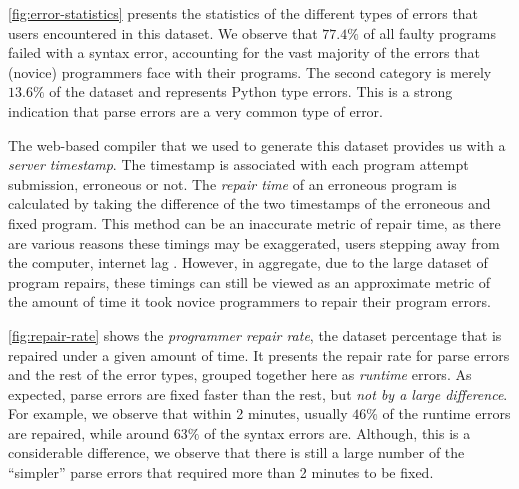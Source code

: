 %
\autoref{fig:error-statistics} presents the statistics
of the different types of errors that users encountered
in this dataset.
%
We observe that $77.4 \% $ of all faulty programs failed
with a syntax error, accounting for the vast majority of
the errors that (novice) programmers face with their
programs.
%
The second category is merely $13.6\%$ of the dataset and
represents Python type errors. This is a strong indication
that parse errors are a very common type of error.

%
The web-based compiler that we used to generate this
dataset provides us with a \emph{server timestamp}.
%
The timestamp is associated with each program attempt
submission, erroneous or not. The \emph{repair time}
of an erroneous program is calculated by taking the
difference of the two timestamps of the erroneous and
fixed program.
%
This method can be an inaccurate metric of repair time,
as there are various reasons these timings may be exaggerated,
\eg users stepping away from the computer, internet lag \etc.
%
However, in aggregate, due to the large
dataset of program repairs, these timings
can still be viewed as an approximate metric
of the amount of time it took novice programmers to
repair their program errors.

\autoref{fig:repair-rate} shows the \emph{programmer repair rate},
\ie the dataset percentage that is repaired under a given amount of time.
%
It presents the repair rate for parse errors and the rest
of the error types, grouped together here as \emph{runtime} errors.
%
As expected, parse errors are fixed faster than the rest,
but \emph{not by a large difference}.
%
For example, we observe that within 2 minutes,
usually $46\%$ of the runtime errors are repaired, while
around $63\%$ of the syntax errors are.
%
Although, this is a considerable difference,
we observe that there is still a large number
of the ``simpler'' parse errors that required
more than 2 minutes to be fixed.


